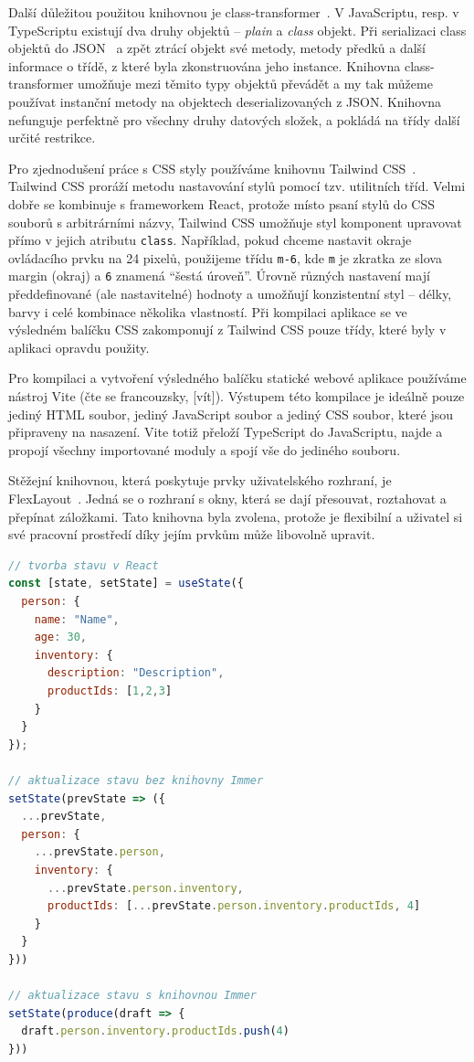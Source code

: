 Další důležitou použitou knihovnou je class-transformer~\cite{attilaolah_classtransformer_2023}.
V JavaScriptu, resp. v TypeScriptu existují dva druhy objektů -- \emph{plain} a \emph{class} objekt.
Při serializaci class objektů do JSON~\cite{tc39group_jsondata_2017} a zpět ztrácí objekt své metody, metody předků a další informace o třídě, z které byla zkonstruována jeho instance.
Knihovna class-transformer umožňuje mezi těmito typy objektů převádět a my tak můžeme používat instanční metody na objektech deserializovaných z JSON.
Knihovna nefunguje perfektně pro všechny druhy datových složek, a pokládá na třídy další určité restrikce.

Pro zjednodušení práce s CSS styly používáme knihovnu Tailwind CSS~\cite{tailwindlabs_tailwindcss_2020}.
Tailwind CSS proráží metodu nastavování stylů pomocí tzv. utilitních tříd.
Velmi dobře se kombinuje s frameworkem React, protože místo psaní stylů do CSS souborů s arbitrárními názvy, Tailwind CSS umožňuje styl komponent upravovat přímo v jejich atributu \texttt{class}.
Například, pokud chceme nastavit okraje ovládacího prvku na 24 pixelů, použijeme třídu \texttt{m-6}, kde \texttt{m} je zkratka ze slova margin (okraj) a \texttt{6} znamená \enquote{šestá úroveň}.
Úrovně různých nastavení mají předdefinované (ale nastavitelné) hodnoty a umožňují konzistentní styl -- délky, barvy i celé kombinace několika vlastností.
Při kompilaci aplikace se ve výsledném balíčku CSS zakomponují z Tailwind CSS pouze třídy, které byly v aplikaci opravdu použity.

Pro kompilaci a vytvoření výsledného balíčku statické webové aplikace používáme nástroj Vite (čte se francouzsky, [vít]).
Výstupem této kompilace je ideálně pouze jediný HTML soubor, jediný JavaScript soubor a jediný CSS soubor, které jsou připraveny na nasazení.
Vite totiž přeloží TypeScript do JavaScriptu, najde a propojí všechny importované moduly a spojí vše do jediného souboru.

Stěžejní knihovnou, která poskytuje prvky uživatelského rozhraní, je FlexLayout~\cite{_flexlayout_2023}.
Jedná se o rozhraní s okny, která se dají přesouvat, roztahovat a přepínat záložkami.
Tato knihovna byla zvolena, protože je flexibilní a uživatel si své pracovní prostředí díky jejím prvkům může libovolně upravit.

\begin{lstlisting}[language=JavaScript,float=htb,caption=Použití knihovny Immer,label=code:immer]
// tvorba stavu v React
const [state, setState] = useState({
  person: {
    name: "Name",
    age: 30,
    inventory: {
      description: "Description",
      productIds: [1,2,3]
    }
  }
});

// aktualizace stavu bez knihovny Immer
setState(prevState => ({
  ...prevState,
  person: {
    ...prevState.person,
    inventory: {
      ...prevState.person.inventory,
      productIds: [...prevState.person.inventory.productIds, 4]
    }
  }
}))

// aktualizace stavu s knihovnou Immer
setState(produce(draft => {
  draft.person.inventory.productIds.push(4)
}))
\end{lstlisting}

